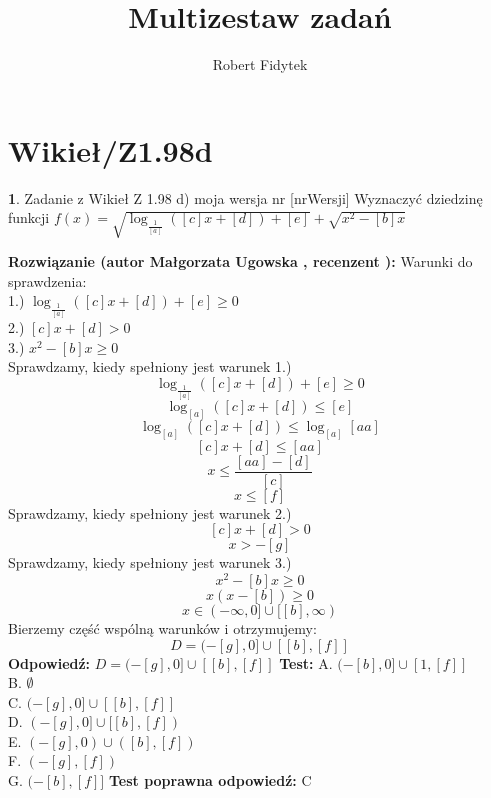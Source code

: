 \documentclass[12pt, a4paper]{article}
\title{Multizestaw zadań}
\author{Robert Fidytek}
\date{}
\theoremstyle{definition} %
\newtheorem{zad}{}
\newcommand{\kategoria}[1]{\section{#1}} %
\newcommand{\zadStart}[1]{\begin{zad}#1\newline} %
\newcommand{\zadStop}{\end{zad}}   %
\newcommand{\rozwStart}[2]{\noindent \textbf{Rozwiązanie (autor #1 , recenzent #2): }\newline} %
\newcommand{\rozwStop}{\newline}                                            %
\newcommand{\odpStart}{\noindent \textbf{Odpowiedź:}\newline}    %
\newcommand{\odpStop}{\newline}                                             %
\newcommand{\testStart}{\noindent \textbf{Test:}\newline} %
\newcommand{\testStop}{\newline} %
\newcommand{\kluczStart}{\noindent \textbf{Test poprawna odpowiedź:}\newline} %
\newcommand{\kluczStop}{\newline} %
\begin{document}
\maketitle


\kategoria{Wikieł/Z1.98d}
\zadStart{Zadanie z Wikieł Z 1.98 d) moja wersja nr [nrWersji]}
Wyznaczyć dziedzinę funkcji $f(x) = \sqrt{\log_{\frac{1}{[a]}}{([c]x+[d])}+[e]} + \sqrt{x^2-[b]x}$
\zadStop
\rozwStart{Małgorzata Ugowska}{}
Warunki do sprawdzenia:\\
1.) $\log_{\frac{1}{[a]}}{([c]x+[d])}+[e] \ge 0$\\
2.) $[c]x+[d] >0$\\
3.) $x^2-[b]x \ge 0$\\
Sprawdzamy, kiedy spełniony jest warunek 1.)
$$\log_{\frac{1}{[a]}}{([c]x+[d])}+[e] \ge 0$$
$$\log_{[a]}{([c]x+[d])} \le [e]$$
$$\log_{[a]}{([c]x+[d])} \le \log_{[a]}{[aa]}$$
$$[c]x+[d] \le [aa]$$
$$x \le \frac{[aa]-[d]}{[c]}$$
$$x \le [f]$$
Sprawdzamy, kiedy spełniony jest warunek 2.)
$$[c]x+[d] >0$$
$$ x >-[g]$$
Sprawdzamy, kiedy spełniony jest warunek 3.)
$$x^2-[b]x \ge 0$$
$$x(x-[b]) \ge 0$$
$$x \in (-\infty, 0] \cup [[b], \infty)$$
Bierzemy czę\'sć wspólną warunków i otrzymujemy:
$$D = (-[g],0] \cup [[b], [f]]$$
\rozwStop
\odpStart
$D =(-[g],0] \cup [[b], [f]]$
\odpStop
\testStart
A. $(-[b],0] \cup [1, [f]]$\\
B. $\emptyset $\\
C. $(-[g],0] \cup [[b], [f]]$\\
D. $(-[g],0] \cup [[b], [f])$\\
E. $(-[g],0) \cup ([b], [f])$\\
F. $(-[g], [f])$\\
G. $(-[b], [f]]$
\testStop
\kluczStart
C
\kluczStop
\end{document}
